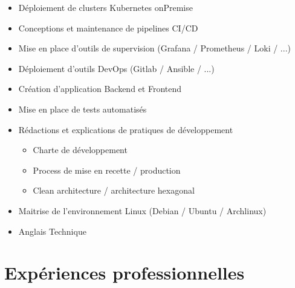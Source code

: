 \documentclass[letterpaper]{twentysecondcv} %
\begin{document}
\begin{itemize}
  \item Déploiement de clusters Kubernetes onPremise
  \item Conceptions et maintenance de pipelines CI/CD
  \item Mise en place d'outils de supervision (Grafana / Prometheus / Loki / ...)
  \item Déploiement d'outils DevOps (Gitlab / Ansible / ...)
  \item Création d'application Backend et Frontend
  \item Mise en place de tests automatisés
  \item Rédactions et explications de pratiques de développement
  \begin{itemize}
    \item Charte de développement
    \item Process de mise en recette / production
    \item Clean architecture / architecture hexagonal
  \end{itemize}
  \item Maitrise de l'environnement Linux (Debian / Ubuntu / Archlinux)
  \item Anglais Technique
\end{itemize}

\vspace*{0.2cm}

\section{Expériences professionnelles}
\end{document}
